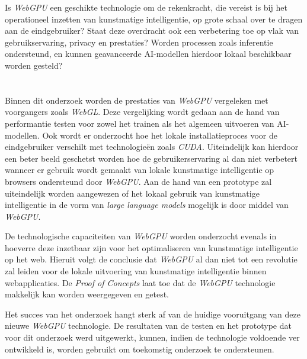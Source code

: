 Is \textit{WebGPU} een geschikte technologie om de rekenkracht, die vereist is bij het operationeel inzetten van kunstmatige intelligentie, op grote schaal over te dragen aan de eindgebruiker? Staat deze overdracht ook een verbetering toe op vlak van gebruikservaring, privacy en prestaties? Worden processen zoals inferentie ondersteund, en kunnen geavanceerde AI-modellen hierdoor lokaal beschikbaar worden gesteld?

\section{}%
\label{sec:onderzoeksdoelstelling}


Binnen dit onderzoek worden de prestaties van \textit{WebGPU} vergeleken met voorgangers zoals \textit{WebGL}. Deze vergelijking wordt gedaan aan de hand van performantie testen voor zowel het trainen als het algemeen uitvoeren van AI-modellen. Ook wordt er onderzocht hoe het lokale installatieproces voor de eindgebruiker verschilt met technologieën zoals \textit{CUDA}. Uiteindelijk kan hierdoor een beter beeld geschetst worden hoe de gebruikerservaring al dan niet verbetert wanneer er gebruik wordt gemaakt van lokale kunstmatige intelligentie op browsers ondersteund door \textit{WebGPU}. Aan de hand van een prototype zal uiteindelijk worden aangewezen of het lokaal gebruik van kunstmatige intelligentie in de vorm van \textit{large language models} mogelijk is door middel van \textit{WebGPU}.

\bigbreak{}

De technologische capaciteiten van \textit{WebGPU} worden onderzocht evenals in hoeverre deze inzetbaar zijn voor het optimaliseren van kunstmatige intelligentie op het web. Hieruit volgt de conclusie dat \textit{WebGPU} al dan niet tot een revolutie zal leiden voor de lokale uitvoering van kunstmatige intelligentie binnen web\-app\-li\-ca\-ties. De \textit{Proof of Concepts} laat toe dat de \textit{WebGPU} technologie makkelijk kan worden weergegeven en getest.

\bigbreak{}

Het succes van het onderzoek hangt sterk af van de huidige vooruitgang van deze nieuwe \textit{WebGPU} technologie. De resultaten van de testen en het prototype dat voor dit onderzoek werd uitgewerkt, kunnen, indien de technologie voldoende ver ontwikkeld is, worden gebruikt om toekomstig onderzoek te ondersteunen.

